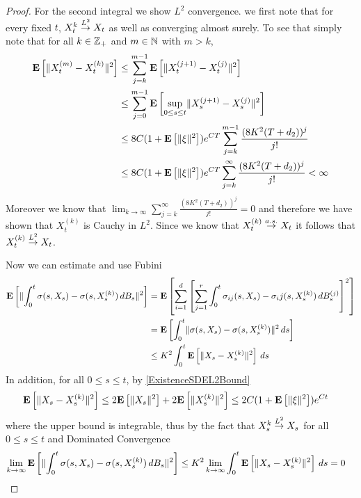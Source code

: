 \begin{proof}
For the second integral we show $L^2$ convergence.  we first note that for every fixed $t$, $X^{k}_t \overset{L^2}\to X_t$ as well as converging almost surely.  To see that simply note that for all $k \in \mathbb{Z}_+$ and $m \in \mathbb{N}$ with $m > k$,
\begin{align*}
\textbf{E}\left[ \lVert X_t^{(m)} - X_t^{(k)} \rVert^2\right] &\leq \sum_{j=k}^{m-1} \textbf{E}\left[ \lVert X_t^{(j+1)} - X_t^{(j)} \rVert^2\right] \\
&\leq \sum_{j=0}^{m-1} \textbf{E}\left[ \sup_{0 \leq s \leq t} \lVert X_s^{(j+1)} - X_s^{(j)} \rVert^2\right] \\
&\leq 8 C(1 + \textbf{E}\left[\lVert \xi \rVert^2\right]) e^{CT} \sum_{j=k}^{m-1} \frac{(8K^2(T + d_2))^{j}}{j!} \\
&\leq  8 C(1 + \textbf{E}\left[\lVert \xi \rVert^2\right]) e^{CT} \sum_{j=k}^{\infty} \frac{(8K^2(T + d_2))^{j}}{j!} < \infty
\end{align*}
Moreover we know that $\lim_{k \to \infty} \sum_{j=k}^{\infty} \frac{(8K^2(T + d_2))^{j}}{j!} = 0$ and therefore we have shown that $X^{(k)}_t$ is Cauchy in $L^2$.  Since we know that $X^{(k)}_t \overset{a.s.}\to X_t$ it follows that $X^{(k)}_t \overset{L^2}\to X_t$.

Now we can estimate and use Fubini
\begin{align*}
\textbf{E}\left[\lVert \int_0^t \sigma(s,X_s) - \sigma(s,X^{(k)}_s) \, dB_s  \rVert^2\right] 
&=\textbf{E}\left[\sum_{i=1}^d \left[ \sum_{j=1}^r \int_0^t \sigma_{ij}(s,X_s) - \sigma_ij(s,X^{(k)}_s) \, dB^{(j)}_s \right]^2 \right] \\
&=\textbf{E}\left[\int_0^t \lVert \sigma(s,X_s) - \sigma(s,X^{(k)}_s)  \rVert^2 \, ds \right] \\
&\leq K^2 \int_0^t \textbf{E}\left[\lVert X_s - X^{(k)}_s  \rVert^2 \right] \, ds 
\end{align*}
In addition,  for all $0 \leq s \leq t$, by \eqref{ExistenceSDEL2Bound}
\begin{align*}
\textbf{E}\left[\lVert X_s - X^{(k)}_s  \rVert^2 \right]
&\leq 2 \textbf{E}\left[\lVert X_s  \rVert^2\right] + 2 \textbf{E}\left[\lVert X^{(k)}_s  \rVert^2 \right]
\leq 2 C (1 +\textbf{E}\left[\lVert \xi \rVert^2\right]) e^{Ct}
\end{align*}
where the upper bound is integrable, thus by the fact that $X^{k}_s \overset{L^2}\to X_s$ for all
$0 \leq s \leq t$ and Dominated Convergence
\begin{align*}
\lim_{k \to \infty} \textbf{E}\left[\lVert \int_0^t \sigma(s,X_s) - \sigma(s,X^{(k)}_s) \, dB_s  \rVert^2\right] &\leq  K^2\lim_{k \to \infty} \int_0^t \textbf{E}\left[\lVert X_s - X^{(k)}_s  \rVert^2 \right] \, ds = 0
\end{align*}


\end{proof}
